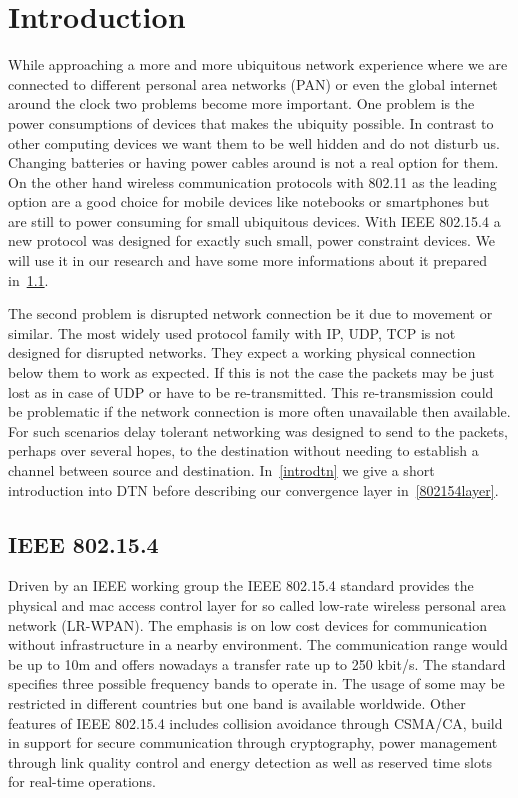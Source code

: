\chapter{Introduction}
While approaching a more and more ubiquitous network experience where we are
connected to different personal area networks (PAN) or even the global internet
around the clock two problems become more important. One problem is the power
consumptions of devices that makes the ubiquity possible. In contrast to other
computing devices we want them to be well hidden and do not disturb us. Changing
batteries or having power cables around is not a real option for them. On the
other hand wireless communication protocols with 802.11 \cite{ieee80211} as the
leading option are a good choice for mobile devices like notebooks or
smartphones but are still to power consuming for small ubiquitous devices.
With IEEE 802.15.4 \cite{ieee802154} a new protocol was designed for exactly such
small, power constraint devices. We will use it in our research and have some
more informations about it prepared in~\ref{intro802154}.

The second problem is disrupted network connection be it due to movement or
similar. The most widely used protocol family with IP, UDP, TCP is not
designed for disrupted networks. They expect a working physical connection below
them to work as expected. If this is not the case the packets may be just lost
as in case of UDP or have to be re-transmitted. This re-transmission could be
problematic if the network connection is more often unavailable then available.
For such scenarios delay tolerant networking was designed to send to the
packets, perhaps over several hopes, to the destination without needing to
establish a channel between source and destination. In~\ref{introdtn} we give a
short introduction into DTN before describing our convergence layer
in~\ref{802154layer}.

\section{IEEE 802.15.4}
\label{intro802154}
Driven by an IEEE working group the IEEE 802.15.4 standard provides the physical and
mac access control layer for so called low-rate wireless personal area network
(LR-WPAN). The emphasis is on low cost devices for communication without
infrastructure in a nearby environment. The communication range would be up to
10m and offers nowadays a transfer rate up to 250 kbit/s. The standard specifies
three possible frequency bands to operate in. The usage of some may be
restricted in different countries but one band is available worldwide. Other
features of IEEE 802.15.4 includes collision avoidance through CSMA/CA, build in
support for secure communication through cryptography, power management through
link quality control and energy detection as well as reserved time slots for
real-time operations.


